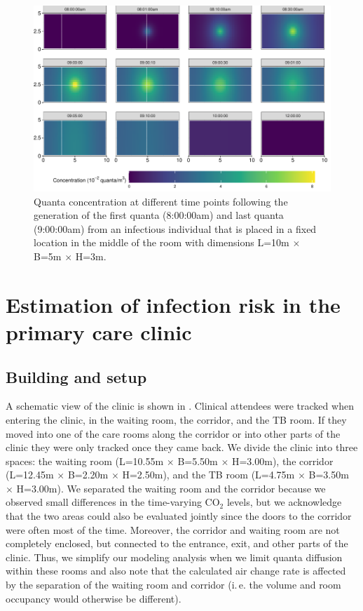 \documentclass[fleqn,11pt]{wlscirep_supp}
\newcommand\ie{i.\,e.\xspace}
\begin{document}
\begin{figure}[!htpb]
    \centering
    \includegraphics{../../tests/stm_v2-toy_example.pdf}
    \caption{Quanta concentration at different time points following the generation of the first quanta (8:00:00am) and last quanta (9:00:00am) from an infectious individual that is placed in a fixed location in the middle of the room with dimensions L=10m $\times$ B=5m $\times$ H=3m.}
    \label{fig:toy-example}
\end{figure}

\clearpage


\section{Estimation of infection risk in the primary care clinic}

\subsection{Building and setup}\label{prep:building}

A schematic view of the clinic is shown in . Clinical attendees were tracked when entering the clinic, in the waiting room, the corridor, and the TB room. If they moved into one of the care rooms along the corridor or into other parts of the clinic they were only tracked once they came back. We divide the clinic into three spaces: the waiting room (L=10.55m $\times$ B=5.50m $\times$ H=3.00m), the corridor (L=12.45m $\times$ B=2.20m $\times$ H=2.50m), and the TB room (L=4.75m $\times$ B=3.50m $\times$ H=3.00m). We separated the waiting room and the corridor because we observed small differences in the time-varying CO$_2$ levels, but we acknowledge that the two areas could also be evaluated jointly since the doors to the corridor were often most of the time. Moreover, the corridor and waiting room are not completely enclosed, but connected to the entrance, exit, and other parts of the clinic. Thus, we simplify our modeling analysis when we limit quanta diffusion within these rooms and also note that the calculated air change rate is affected by the separation of the waiting room and corridor (\ie the volume and room occupancy would otherwise be different). 
\end{document}
